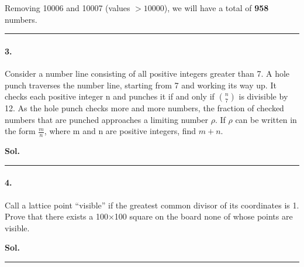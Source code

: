 \documentclass[12pt,oneside,reqno]{amsart}
\begin{document}
Removing 10006 and 10007 (values $ > 10000 $), we will have a total of \textbf{958} numbers.

\par\noindent\textcolor{gray}{\rule{\textwidth}{0.5pt}}
\smallskip
\pagebreak
\paragraph*{3.} Consider a number line consisting of all positive integers greater than 7.  A hole punch traverses the number line, starting from 7 and working its way up.  It checks each positive integer n and punches it if and only if $\binom{n}{7}$ is divisible by 12.  As the hole punch checks more and more numbers, the fraction of checked numbers that are punched approaches a limiting number $\rho$.  If $\rho$ can be written in the form $\frac{m}{n}$, where m and n are positive integers, find $m+n$.

\bigskip
\textbf{Sol.}
\par\noindent\textcolor{gray}{\rule{\textwidth}{0.5pt}}
\smallskip

\paragraph*{4.} Call a lattice point “visible” if the greatest common divisor of its coordinates is 1.  Prove that there exists a 100×100 square on the board none of whose points are visible.

\bigskip
\textbf{Sol.}
\par\noindent\textcolor{gray}{\rule{\textwidth}{0.5pt}}
\smallskip
\end{document}
